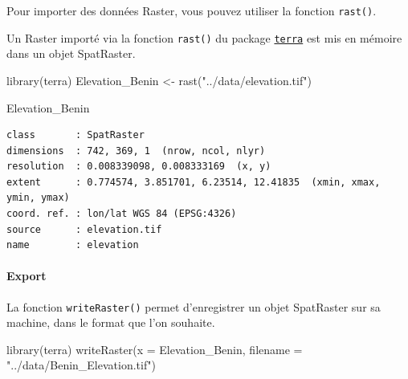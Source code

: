 \documentclass[
  letterpaper,
  DIV=11,
  numbers=noendperiod]{scrartcl}
\let\oldparagraph\paragraph
\renewcommand{\paragraph}[1]{\oldparagraph{#1}\mbox{}}
\newenvironment{Shaded}{\begin{snugshade}}{\end{snugshade}}
\newcommand{\AttributeTok}[1]{\textcolor[rgb]{0.40,0.45,0.13}{#1}}
\newcommand{\FunctionTok}[1]{\textcolor[rgb]{0.28,0.35,0.67}{#1}}
\newcommand{\NormalTok}[1]{\textcolor[rgb]{0.00,0.23,0.31}{#1}}
\newcommand{\OtherTok}[1]{\textcolor[rgb]{0.00,0.23,0.31}{#1}}
\newcommand{\StringTok}[1]{\textcolor[rgb]{0.13,0.47,0.30}{#1}}
\begin{document}
Pour importer des données Raster, vous pouvez utiliser la fonction
\texttt{rast()}.

\begin{tcolorbox}[enhanced jigsaw, colframe=quarto-callout-important-color-frame, bottomtitle=1mm, colback=white, leftrule=.75mm, breakable, left=2mm, titlerule=0mm, toptitle=1mm, arc=.35mm, title=\textcolor{quarto-callout-important-color}{\faExclamation}\hspace{0.5em}{Important}, rightrule=.15mm, bottomrule=.15mm, toprule=.15mm, colbacktitle=quarto-callout-important-color!10!white, opacitybacktitle=0.6, opacityback=0, coltitle=black]

Un Raster importé via la fonction \texttt{rast()} du package
\href{https://rspatial.org/index.html}{\texttt{terra}} est mis en
mémoire dans un objet SpatRaster.

\end{tcolorbox}

\begin{Shaded}
\begin{Highlighting}[]
\FunctionTok{library}\NormalTok{(terra)}
\NormalTok{Elevation\_Benin }\OtherTok{\textless{}{-}} \FunctionTok{rast}\NormalTok{(}\StringTok{"../data/elevation.tif"}\NormalTok{) }

\NormalTok{Elevation\_Benin}
\end{Highlighting}
\end{Shaded}

\begin{verbatim}
class       : SpatRaster 
dimensions  : 742, 369, 1  (nrow, ncol, nlyr)
resolution  : 0.008339098, 0.008333169  (x, y)
extent      : 0.774574, 3.851701, 6.23514, 12.41835  (xmin, xmax, ymin, ymax)
coord. ref. : lon/lat WGS 84 (EPSG:4326) 
source      : elevation.tif 
name        : elevation 
\end{verbatim}

\hypertarget{export-3}{%
\paragraph{Export}\label{export-3}}

La fonction \texttt{writeRaster()} permet d'enregistrer un objet
SpatRaster sur sa machine, dans le format que l'on souhaite.

\begin{Shaded}
\begin{Highlighting}[]
\FunctionTok{library}\NormalTok{(terra)}
\FunctionTok{writeRaster}\NormalTok{(}\AttributeTok{x =}\NormalTok{ Elevation\_Benin, }\AttributeTok{filename =} \StringTok{"../data/Benin\_Elevation.tif"}\NormalTok{)}
\end{Highlighting}
\end{Shaded}
\end{document}
